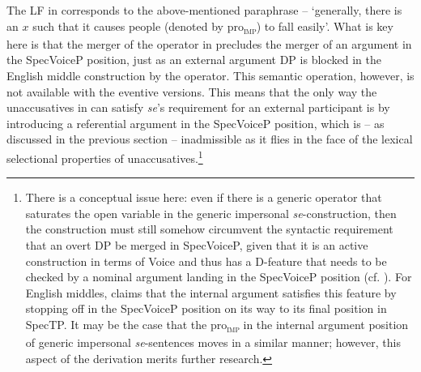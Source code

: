 \documentclass[output=paper,
modfonts,nonflat,
newtxmath
]{langsci/langscibook}
\begin{document}
\noindent The LF in  corresponds to the above-mentioned paraphrase  – `generally, there is an $x$ such that it causes people (denoted by pro\textsubscript{\textsc{imp}}) to fall easily'. What is key here is that the merger of the  operator in  precludes the merger of an argument in the SpecVoiceP position, just as an external argument DP is blocked in the English middle construction by the operator. This semantic operation, however, is not available with the eventive versions. This means that the only way the unaccusatives in  can satisfy \textit{se}’s requirement for an external participant is by introducing a referential argument in the SpecVoiceP position, which is -- as discussed in the previous section -- inadmissible as it flies in the face of the lexical selectional properties of unaccusatives.\footnote{There is a conceptual issue here: even if there is a generic operator that saturates the open variable in the generic impersonal \textit{se}-construction, then the construction must still somehow circumvent the syntactic requirement that an overt DP be merged in SpecVoiceP, given that it is an active construction in terms of Voice and thus has a D-feature that needs to be checked by a nominal argument landing in the SpecVoiceP position (cf. ). For English middles, \citet{schaffer2007} claims that the internal argument satisfies this feature by stopping off in the SpecVoiceP position on its way to its final position in SpecTP. It may be the case that the pro\textsubscript{\textsc{imp}} in the internal argument position of generic impersonal \textit{se}-sentences moves in a similar manner; however, this aspect  of the derivation merits further research.}
\end{document}
